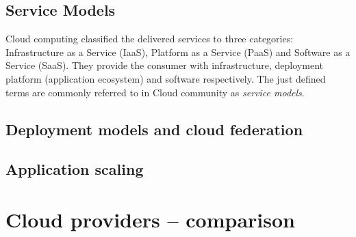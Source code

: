 \documentclass[twocolumn]{svjour3}          %
\begin{document}
\subsection{Service Models}
Cloud computing classified the delivered services to three categories: Infrastructure as a Service (IaaS), Platform as a Service (PaaS) and Software as a Service (SaaS). They provide the consumer with infrastructure, deployment platform (application ecosystem) and software respectively. The just defined terms are commonly referred to in Cloud community as \emph{service models}.

\subsection{Deployment models and cloud federation}

\subsection{Application scaling}


\section{Cloud providers -- comparison}
\end{document}
